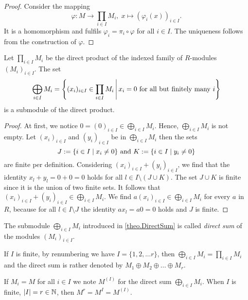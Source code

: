 \begin{proof}
Consider the mapping 
\[\varphi\colon M\to \prod_{i\in I} M_i, \; x \mapsto (\varphi_i(x))_{i\in I}.\]
It is a homomorphism and fulfils $\varphi_i=\pi_i\circ\varphi$ for all $i\in I$. The uniqueness follows from the construction of $\varphi$.
\end{proof}

\begin{thm}\label{theo.DirectSum}
Let $\prod_{i\in I} M_i$ be the direct product of the indexed family of $R$-modules $(M_i)_{i\in I}$. The set
\begin{equation*}
\bigoplus_{i\in I}M_i=\left\lbrace (x_i)_{i\in I}\in \prod_{i\in I} M_i \middle\arrowvert x_i=0 \textnormal{ for all but finitely many } i\right\rbrace
\end{equation*}
is a submodule of the direct product.
\end{thm}

\begin{proof}
At first, we notice $0=(0)_{i\in I}\in \bigoplus_{i\in I}M_i$. Hence, $\bigoplus_{i\in I}M_i$ is not empty. Let $(x_i)_{i\in I}$ and $(y_i)_{i\in I}$ be in $\bigoplus_{i\in I}M_i$ then the sets
\begin{equation*}
J:=\lbrace i\in I\mid x_i\neq 0\rbrace \textnormal{ and } K:=\lbrace i\in I\mid y_i\neq 0\rbrace
\end{equation*} 
are finite per definition. Considering $(x_i)_{i\in I}+(y_i)_{i\in I}$, we find that the identity $x_l+y_l=0+0=0$ holds for all $l\in I\setminus (J\cup K)$. The set $J\cup K$ is finite since it is the union of two finite sets. It follows that $(x_i)_{i\in I}+(y_i)_{i\in I}\in \bigoplus_{i\in I}M_i$. We find $a(x_i)_{i\in I}\in \bigoplus_{i\in I}M_i$ for every $a$ in $R$, because for all $l\in I\setminus J$ the identity $ax_l=a0=0$ holds and $J$ is finite.
\end{proof}

\begin{defin}
\begin{thmlist}
\item\sloppypar The submodule $\bigoplus_{i\in I}M_i$ introduced in \cref{theo.DirectSum} is called \emph{direct sum} of the modules $(M_i)_{i\in I}$.
\item If $I$ is finite, \ie{} by renumbering we have $I=\lbrace 1,2,\ldots r\rbrace$, then $\bigoplus_{i\in I}M_i=\prod_{i\in I} M_i$ and the direct sum is rather denoted by $M_1\oplus M_2\oplus\ldots\oplus M_r$.
\item If $M_i=M$ for all $i\in I$ we note $M^{(I)}$ for the direct sum $\bigoplus_{i\in I}M_i$. When $I$ is finite, \ie{} $|I|=r\in\operatorname{\mathbb{N}}$, then $M^r=M^I=M^{(I)}$.
\end{thmlist}
\end{defin}

